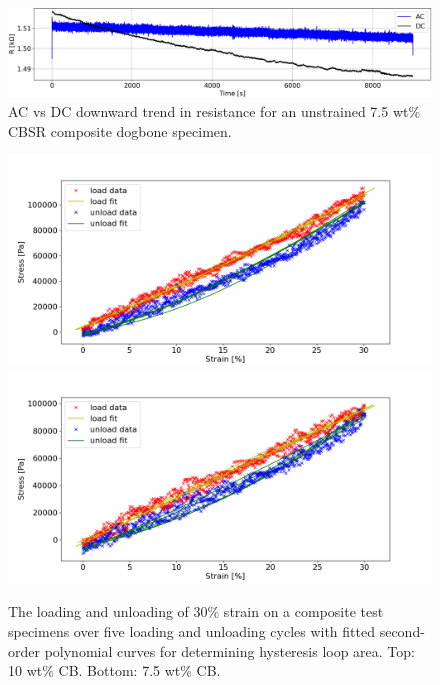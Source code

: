 \begin{figure}[H]
	\centering
	\includegraphics[width=\linewidth]{Figures/AC_vs_DC_long_decay_2_7-5_CBSR}
	\caption{AC vs DC downward trend in resistance for an unstrained 7.5 wt\% CBSR composite dogbone specimen.}
	\label{fig:res-AC-DC}
\end{figure}

\begin{figure}[H]
	\centering
	\includegraphics[width=0.9\linewidth]{Figures/load_unload_1_10_E4pin_20mm_v9_0.3Strain_fitted.png}
	\includegraphics[width=0.9\linewidth]{Figures/load_unload_2_7-5_E4pin_20mm_v10_0.3Strain_fitted.png}
	\caption{The loading and unloading of 30\% strain on a composite test specimens over five loading and unloading cycles with fitted second-order polynomial curves for determining hysteresis loop area. Top: 10 wt\% CB. Bottom: 7.5 wt\% CB.}
	\label{fig:fitted_loading-and-unloading-specimens}
\end{figure}



